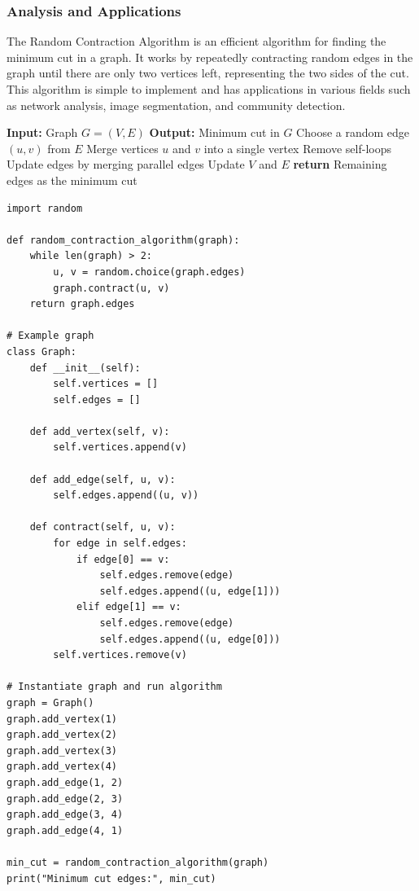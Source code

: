 \documentclass[12pt]{book} %
\begin{document}
\subsubsection{Analysis and Applications}
The Random Contraction Algorithm is an efficient algorithm for finding the minimum cut in a graph. It works by repeatedly contracting random edges in the graph until there are only two vertices left, representing the two sides of the cut. This algorithm is simple to implement and has applications in various fields such as network analysis, image segmentation, and community detection.
\FloatBarrier
\begin{algorithm}
  \caption{Random Contraction Algorithm}
  \begin{algorithmic}[1]
    \State \textbf{Input:} Graph $G=(V,E)$
    \State \textbf{Output:} Minimum cut in $G$
      \State Choose a random edge $(u, v)$ from $E$
      \State Merge vertices $u$ and $v$ into a single vertex
      \State Remove self-loops
      \State Update edges by merging parallel edges
      \State Update $V$ and $E$
    \EndWhile
    \State \textbf{return} Remaining edges as the minimum cut
  \end{algorithmic}
\end{algorithm}

\FloatBarrier
\begin{lstlisting}
import random

def random_contraction_algorithm(graph):
    while len(graph) > 2:
        u, v = random.choice(graph.edges)
        graph.contract(u, v)
    return graph.edges

# Example graph
class Graph:
    def __init__(self):
        self.vertices = []
        self.edges = []

    def add_vertex(self, v):
        self.vertices.append(v)

    def add_edge(self, u, v):
        self.edges.append((u, v))

    def contract(self, u, v):
        for edge in self.edges:
            if edge[0] == v:
                self.edges.remove(edge)
                self.edges.append((u, edge[1]))
            elif edge[1] == v:
                self.edges.remove(edge)
                self.edges.append((u, edge[0]))
        self.vertices.remove(v)

# Instantiate graph and run algorithm
graph = Graph()
graph.add_vertex(1)
graph.add_vertex(2)
graph.add_vertex(3)
graph.add_vertex(4)
graph.add_edge(1, 2)
graph.add_edge(2, 3)
graph.add_edge(3, 4)
graph.add_edge(4, 1)

min_cut = random_contraction_algorithm(graph)
print("Minimum cut edges:", min_cut)
\end{lstlisting}
\FloatBarrier
\end{document}
